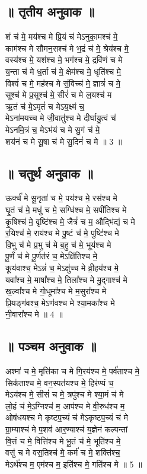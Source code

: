 \subsection{॥ तृतीय अनुवाक ॥}
शं च॑ मे॒ मय॑श्च मे प्रि॒यं च॑ मेऽनुका॒मश्च॑ मे॒\\
काम॑श्च मे सौमन॒सश्च॑ मे भ॒द्रं च॑ मे॒ श्रेय॑श्च मे॒\\
वस्य॑श्च मे॒ यश॑श्च मे॒ भग॑श्च मे॒ द्रवि॑णं च मे\\
य॒न्ता च॑ मे ध॒र्ता च॑ मे॒ क्षेम॑श्च मे॒ धृति॑श्च मे॒\\
विश्वं॑ च मे॒ मह॑श्च मे सं॒विच्च॑ मे॒ ज्ञात्रं॑ च मे॒\\
सूश्च॑ मे प्र॒सूश्च॑ मे॒ सीरं॑ च मे ल॒यश्च॑ म\\
ऋ॒तं च॑ मे॒ऽमृतं॑ च मेऽय॒क्ष्मं च॒\\
मेऽना॑मयच्च मे जी॒वातु॑श्च मे दीर्घायु॒त्वं च॑\\
मेऽनमि॒त्रं च॒ मेऽभ॑यं च मे सु॒गं च॑ मे॒\\
शय॑नं च मे सू॒षा च॑ मे सु॒दिनं॑ च मे ॥ 3 ॥\\
\subsection{॥ चतुर्थ अनुवाक ॥}
ऊर्क्च॑ मे सू॒नृता॑ च मे॒ पय॑श्च मे॒ रस॑श्च मे\\
घृ॒तं च॑ मे॒ मधु॑ च मे॒ सग्धि॑श्च मे॒ सपी॑तिश्च मे\\
कृ॒षिश्च॑ मे॒ वृष्टि॑श्च मे॒ जैत्रं॑ च म॒ औद्भि॑द्यं च मे\\
र॒यिश्च॑ मे॒ राय॑श्च मे पु॒ष्टं च॑ मे॒ पुष्टि॑श्च मे\\
वि॒भु च॑ मे प्र॒भु च॑ मे ब॒हु च॑ मे॒ भूय॑श्च मे\\
पू॒र्णं च॑ मे पू॒र्णत॑रं च॒ मेऽक्षि॑तिश्च मे॒\\
कूय॑वाश्च॒ मेऽन्नं॑ च॒ मेऽक्षु॑च्च मे व्री॒हय॑श्च मे॒\\
यवा᳚श्च मे॒ माषा᳚श्च मे॒ तिला᳚श्च मे मु॒द्गाश्च॑ मे\\
ख॒ल्वा᳚श्च मे गो॒धूमा᳚श्च मे म॒सुरा᳚श्च मे\\
प्रि॒यङ्ग॑वश्च॒ मेऽण॑वश्च मे श्या॒मका᳚श्च मे\\
नी॒वारा᳚श्च मे ॥ 4 ॥\\
\subsection{॥ पञ्चम अनुवाक ॥}
अश्मा॑ च मे॒ मृत्ति॑का च मे गि॒रय॑श्च मे॒ पर्व॑ताश्च मे॒\\
सिक॑ताश्च मे॒ वन॒स्पत॑यश्च मे॒ हिर॑ण्यं च॒\\
मेऽय॑श्च मे॒ सीसं॑ च मे॒ त्रपु॑श्च मे श्या॒मं च॑ मे\\
लो॒हं च॑ मे॒ऽग्निश्च॑ म॒ आप॑श्च मे वी॒रुध॑श्च म॒\\
ओष॑धयश्च मे कृष्टप॒च्यं च॑ मेऽकृष्टप॒च्यं च॑ मे\\
ग्रा॒म्याश्च॑ मे प॒शव॑ आर॒ण्याश्च॑ य॒ज्ञेन॑ कल्पन्तां\\
वि॒त्तं च मे॒ वित्ति॑श्च मे भू॒तं च॑ मे॒ भूति॑श्च मे॒\\
वसु॑ च मे वस॒तिश्च॑ मे॒ कर्म॑ च मे॒ शक्ति॑श्च॒\\
मेऽर्थ॑श्च म॒ एम॑श्च म॒ इति॑श्च मे॒ गति॑श्च मे ॥ 5 ॥\\
